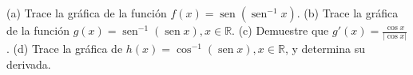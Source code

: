 \item (a) Trace la gráfica de la función $f(x) = \operatorname{sen}(\operatorname{sen}^{-1} x)$. (b) Trace la gráfica de la función $g(x) = \operatorname{sen}^{-1}(\operatorname{sen} x), x \in \mathbb{R}$. (c) Demuestre que $g'(x) = \frac{\cos x}{|\cos x|}$. (d) Trace la gráfica de $h(x) = \cos^{-1}(\operatorname{sen} x), x \in \mathbb{R}$, y determina su derivada.
